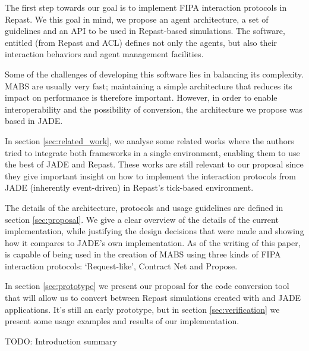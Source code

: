 The first step towards our goal is to implement FIPA interaction protocols in Repast. We this goal in mind, we propose an agent architecture, a set of guidelines and an API to be used in Repast-based simulations. The software, entitled \apiname{} (from Repast and ACL) defines not only the agents, but also their interaction behaviors and agent management facilities.

Some of the challenges of developing this software lies in balancing its complexity. MABS are usually very fast; maintaining a simple architecture that reduces its impact on performance is therefore important. However, in order to enable interoperability and the possibility of conversion, the architecture we propose was based in JADE.

In section \ref{sec:related_work}, we analyse some related works where the authors tried to integrate both frameworks in a single environment, enabling them to use the best of JADE and Repast. These works are still relevant to our proposal since they give important insight on how to implement the interaction protocols from JADE (inherently event-driven) in Repast's tick-based environment.

The details of the architecture, protocols and usage guidelines are defined in section \ref{sec:proposal}. We give a clear overview of the details of the current implementation, while justifying the design decisions that were made and showing how it compares to JADE's own implementation. As of the writing of this paper, \apiname{} is capable of being used in the creation of MABS using three kinds of FIPA interaction protocols: `Request-like', Contract Net and Propose.

In section \ref{sec:prototype} we present our proposal for the code conversion tool that will allow us to convert between Repast simulations created with \apiname{} and JADE applications. It's still an early prototype, but in section \ref{sec:verification} we present some usage examples and results of our implementation.

 TODO: Introduction summary